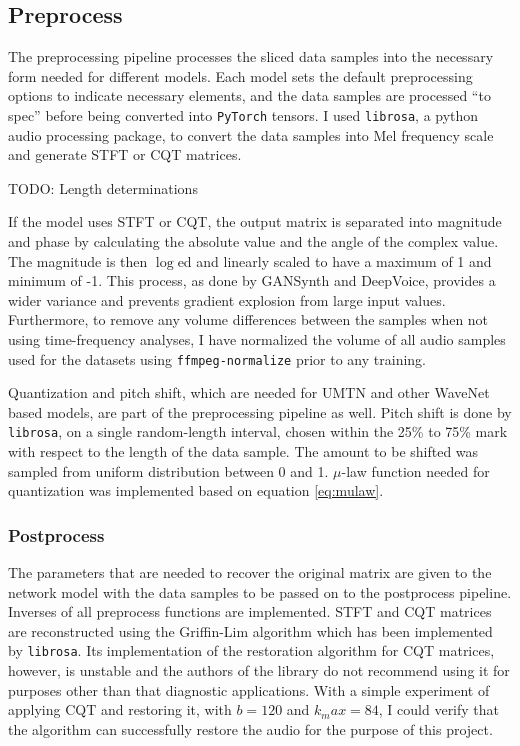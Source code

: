 \documentclass[]{report}
\begin{document}
\hypertarget{preprocess}{%
\subsection{Preprocess}\label{preprocess}}

The preprocessing pipeline processes the sliced data samples into the
necessary form needed for different models. Each model sets the default
preprocessing options to indicate necessary elements, and the data
samples are processed ``to spec'' before being converted into
\texttt{PyTorch} tensors. I used \texttt{librosa}, a python audio
processing package, to convert the data samples into Mel frequency scale
and generate STFT or CQT matrices.

TODO: Length determinations

If the model uses STFT or CQT, the output matrix is separated into
magnitude and phase by calculating the absolute value and the angle of
the complex value. The magnitude is then \(\log\)ed and linearly scaled
to have a maximum of 1 and minimum of -1. This process, as done by
GANSynth and DeepVoice, provides a wider variance and prevents gradient
explosion from large input values. Furthermore, to remove any volume
differences between the samples when not using time-frequency analyses,
I have normalized the volume of all audio samples used for the datasets
using \texttt{ffmpeg-normalize} prior to any training.

Quantization and pitch shift, which are needed for UMTN and other
WaveNet based models, are part of the preprocessing pipeline as well.
Pitch shift is done by \texttt{librosa}, on a single random-length
interval, chosen within the 25\% to 75\% mark with respect to the length
of the data sample. The amount to be shifted was sampled from uniform
distribution between 0 and 1. \(\mu\)-law function needed for
quantization was implemented based on equation \ref{eq:mulaw}.

\hypertarget{postprocess}{%
\subsubsection{Postprocess}\label{postprocess}}

The parameters that are needed to recover the original matrix are given
to the network model with the data samples to be passed on to the
postprocess pipeline. Inverses of all preprocess functions are
implemented. STFT and CQT matrices are reconstructed using the
Griffin-Lim algorithm which has been implemented by \texttt{librosa}.
Its implementation of the restoration algorithm for CQT matrices,
however, is unstable and the authors of the library do not recommend
using it for purposes other than that diagnostic applications. With a
simple experiment of applying CQT and restoring it, with \(b = 120\) and
\(k_max = 84\), I could verify that the algorithm can successfully
restore the audio for the purpose of this project.
\end{document}
